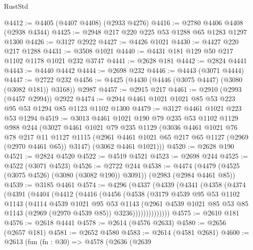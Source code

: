 \begin{lexlean}{RustStd}
\begin{coremodule}
@4412 := @4405 (@4407 @4408) (@2933 @4276)
@4416 := @2780 @4406 @4408 (@2938 @4344)
@4425 := @2948 @217 @220 @225 @53 @1288 @65 @1283 @1297 @1300
@4426 := @3127 @2922
@4427 := @4426 @1021
@4430 := @4427 @220 @217 @1288
@4431 := @3508 @1021
@4440 := @4431 @181 @129 @50 @217 @1102 @1178 @1021 @232 @3747
@4441 := @2628 @181
@4442 := @2824 @4441
@4443 := @4440 @4442
@4444 := @2698 @232
@4446 := @4443 (@3071 @4444)
@4447 := @2722 @232
@4456 := @4425 (@4430 (@4446 (@3075 @4447) (@3080 (@3082 @181)) @3168)) @2987
@4457 := @2915 @217
@4461 := @2910 (@2993 (@4457 @2994)) @2922
@4474 := @2944 @4461 @1021 @1021 @85 @53 @223 @95 @53 @1294 @85 @1123 @1102 @1300
@4479 := @3127 @4461 @1021 @223 @53 @1294
@4519 := @3013
    @4461
    @1021
    @190
    @79
    @235
    @53
    @1102
    @1129
    @988
    @244
    (@3027
      @4461
      @1021
      @79
      @235
      @1129
      (@3036
        @4461
        @1021
        @76
        @78
        @217
        @11
        @1127
        @1115
        (@2961 @4461 @1021 @65 @217 @65 @1127 (@2969 (@2970 @4461 @65)) @3147)
        (@3062 @4461 @1021)))
@4520 := @2628 @190
@4521 := @2824 @4520
@4522 := @4519 @4521
@4523 := @2698 @244
@4525 := @4522 (@3071 @4523)
@4526 := @2722 @244
@4538 := @4474 (@4479 (@4525 (@3075 @4526) (@3080 (@3082 @190)) @3091)) (@2983 (@2984 @4461 @85))
@4539 := @3185 @4461
@4574 := @4296
    (@4337
      (@4339
        (@4341
          (@4358
            (@4374
              (@4391
                (@4404
                  (@4412
                    (@4416
                      (@4456
                        (@4538
                          (@3179
                            @4539
                            @95
                            @53
                            @1102
                            @1143
                            (@4114
                              @4539
                              @1021
                              @95
                              @53
                              @1143
                              (@2961
                                @4539
                                @1021
                                @85
                                @53
                                @85
                                @1143
                                (@2969 (@2970 @4539 @85))
                                @3236))))))))))))))
@4575 := @2610 @181
@4576 := @2618 @4441
@4578 := @2614 (@4576 @2633)
@4580 := @2656 (@2657 @181)
@4581 := @2652 @4580
@4583 := @2614 (@4581 @2681)
@4600 := @2613
    (fun (fn : @30) =>
    @4578
      (@2636
        (@2639

\end{coremodule}
\end{lexlean}
